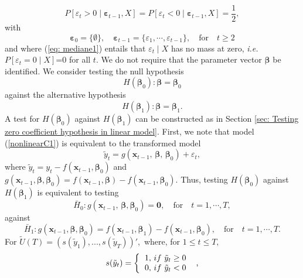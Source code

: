 \documentclass[harvard,11pt]{article}
\begin{document}
\begin{equation}\label{eq: mediane1}
P[\varepsilon_{t}> 0\mid \bm{{\varepsilon}}_{t-1},X]=P[\varepsilon_{t}<0\mid \bm{\varepsilon}_{t-1},X]=\frac{1}{2},
\end{equation}%
with
\[
\bm{\varepsilon}_{0}=\{\emptyset\},\quad\bm{\varepsilon}_{t-1}=\{\varepsilon_1,\cdots,\varepsilon_{t-1}\},\quad\text{for}\quad t\geq2
\]
and where (\ref{eq: mediane1}) entails that $\varepsilon_t\mid X$ has no mass at zero, \emph{i.e.} $P[\varepsilon_t=0\mid X]$=0 for all $t$. We do not require that the
parameter vector $\bm{\beta} $ be identified. We consider testing the null hypothesis%
\begin{equation}
H(\bm{\beta}_{0}):\bm{\beta} =\bm{\beta} _{0}  \label{h01}
\end{equation}%
against the alternative hypothesis%
\begin{equation}
H(\bm{\beta}_{1}):\bm{\beta} =\bm{\beta}_{1}\text{.}  \label{h02}
\end{equation}%
A test for $H(\bm{\beta}_{0})$ against $H(\bm{\beta}_{1})$ can be constructed as in
Section \ref{sec: Testing zero coefficient hypothesis in linear model}.
First, we note that model (\ref{nonlinearC1}) is equivalent to the
transformed model%
\begin{equation*}
\tilde{y}_{t}=g(\bm{x}_{t-1},\,\bm{\beta} ,\,\bm{\beta} _{0})+\varepsilon_{t},
\end{equation*}%
where $\tilde{y}_{t}=y_{t}-f(\bm{x}_{t-1},\bm{\beta}_{0})$ and\ $g(\bm{x}_{t-1},\bm{\beta}
,\bm{\beta} _{0})=f(\bm{x}_{t-1},\bm{\beta} )-f(\bm{x}_{t-1},\bm{\beta}_{0})$. Thus, testing $%
H(\bm{\beta}_{0})$ against $H(\bm{\beta}_{1})$ is equivalent to testing%
\begin{equation*}
\bar{H}_{0}:g(\bm{x}_{t-1},\,\bm{\beta} ,\bm{\beta} _{0})=\bm{0},\quad\text{for}\quad t=1,\cdots,T,
\end{equation*}%
against%
\begin{equation*}
\bar{H}_{1}:g(\bm{x}_{t-1},\bm{\beta} ,\bm{\beta}_{0})=f(\bm{x}_{t-1},\bm{\beta}_{1})-f(\bm{x}_{t-1},\bm{\beta}
_{0}),\quad\text{for}\quad t=1,\cdots,T.
\end{equation*}%
For $\tilde{U}(T)=(s(\tilde{y}_{1}),...,s(\tilde{y}_{T}))',$
where, for $1\leq t\leq T,$%
\begin{equation*}
s(\tilde{y}_{t})=\left\{ 
\begin{tabular}{l}
$1,$ $if$ $\tilde{y}_{t}\geq 0$ \\ 
$0,$ $if$ $\tilde{y}_{t}<0$%
\end{tabular}%
\ \right. \text{,}
\end{equation*}%
\end{document}
